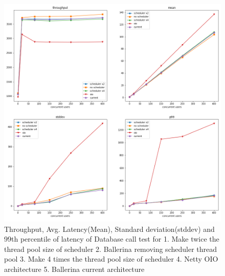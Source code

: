\begin{figure}[htbp]
	\begin{center}
		\includegraphics[scale=0.5]{figures/db_select test results.png}
	\end{center}
	\caption{Throughput, Avg. Latency(Mean), Standard deviation(stddev) and 99th percentile of latency  of Database call test for 1. Make twice the thread pool size of scheduler 2. Ballerina removing scheduler thread pool 3. Make 4 times the thread pool size of scheduler 4. Netty OIO architecture 5. Ballerina current architecture }
	\label{phase-1-database-all-architectures}
\end{figure}

